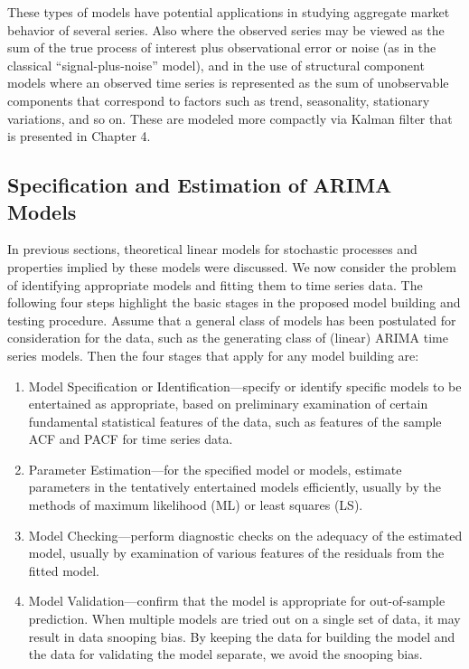 These types of models have potential applications in studying aggregate market behavior of several series. Also where the observed series may be viewed as the sum of the true process of interest plus observational error or noise (as in the classical ``signal-plus-noise'' model), and in the use of structural component models where an observed time series is represented as the sum of unobservable components that correspond to factors such as trend, seasonality, stationary variations, and so on. These are modeled more compactly via Kalman filter that is presented in Chapter 4. 


\subsection{Specification and Estimation of ARIMA Models} \hfill


In previous sections, theoretical linear models for stochastic processes and properties implied by these models were discussed. We now consider the problem of identifying appropriate models and fitting them to time series data. The following four steps highlight the basic stages in the proposed model building and testing procedure. Assume that a general class of models has been postulated for consideration for the data, such as the generating class of (linear) ARIMA time series models. Then the four stages that apply for any model building are: 
\begin{enumerate}
\item Model Specification or Identification---specify or identify specific models to be entertained as appropriate, based on preliminary examination of certain fundamental statistical features of the data, such as features of the sample ACF and PACF for time series data.

\item Parameter Estimation---for the specified model or models, estimate parameters in the tentatively entertained models efficiently, usually by the methods of maximum likelihood (ML) or least squares (LS).

\item Model Checking---perform diagnostic checks on the adequacy of the estimated model, usually by examination of various features of the residuals from the fitted model.

\item Model Validation---confirm that the model is appropriate for out-of-sample prediction. When multiple models are tried out on a single set of data, it may result in data snooping bias. By keeping the data for building the model and the data for validating the model separate, we avoid the snooping bias.
\end{enumerate}

